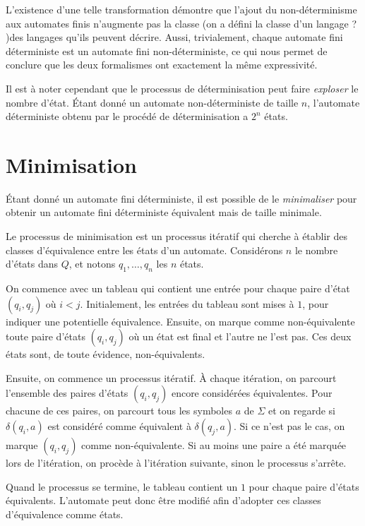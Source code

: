 L'existence d'une telle transformation démontre que l'ajout du non-déterminisme aux automates finis n'augmente pas la classe (on a défini la classe d'un langage ? )des langages qu'ils peuvent décrire. Aussi, trivialement, chaque automate fini déterministe est un automate fini non-déterministe, ce qui nous permet de conclure que les deux formalismes ont exactement la même expressivité.

Il est à noter cependant que le processus de déterminisation peut faire \textit{exploser} le nombre d'état.
Étant donné un automate non-déterministe de taille $n$, l'automate déterministe obtenu par le procédé de déterminisation a $2^n$ états.

\section{Minimisation}

Étant donné un automate fini déterministe, il est possible de le \og \textit{minimaliser} \fg{} pour obtenir un automate fini déterministe équivalent mais de taille minimale.

Le processus de minimisation est un processus itératif qui cherche à établir des classes d'équivalence entre les états d'un automate.
Considérons $n$ le nombre d'états dans $Q$, et notons $q_1, \dots, q_n$ les $n$ états.

On commence avec un tableau qui contient une entrée pour chaque paire d'état $(q_i, q_j)$ où $i < j$.
Initialement, les entrées du tableau sont mises à $1$, pour indiquer une potentielle équivalence.
Ensuite, on marque comme non-équivalente toute paire d'états $(q_i, q_j)$ où un état est final et l'autre ne l'est pas.
Ces deux états sont, de toute évidence, non-équivalents.

Ensuite, on commence un processus itératif. À chaque itération, on parcourt l'ensemble des paires d'états $(q_i, q_j)$ encore considérées équivalentes.
Pour chacune de ces paires, on parcourt tous les symboles $a$ de $\Sigma$ et on regarde si $\delta(q_i, a)$ est considéré comme équivalent à $\delta(q_j, a)$.
Si ce n'est pas le cas, on marque $(q_i, q_j)$ comme non-équivalente.
Si au moins une paire a été marquée lors de l'itération, on procède à l'itération suivante, sinon le processus s'arrête.

Quand le processus se termine, le tableau contient un $1$ pour chaque paire d'états équivalents.
L'automate peut donc être modifié afin d'adopter ces classes d'équivalence comme états.

